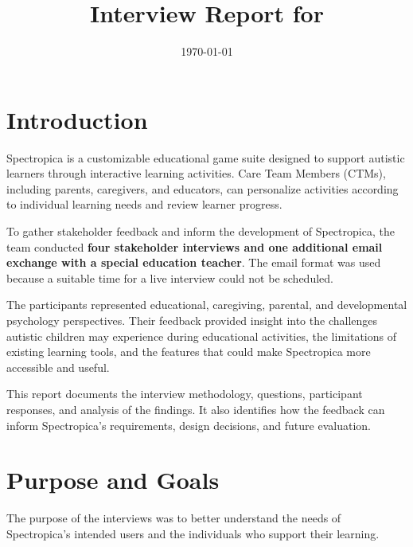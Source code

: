 \documentclass[12pt, titlepage]{article}
\title{Interview Report for \progname{}}
\author{\authname}
\date{\today}
\begin{document}
\maketitle
{}
\tableofcontents
\newpage
{}

\section{Introduction}

Spectropica is a customizable educational game suite designed to support autistic learners through interactive learning activities. Care Team Members (CTMs), including parents, caregivers, and educators, can personalize activities according to individual learning needs and review learner progress.

To gather stakeholder feedback and inform the development of Spectropica, the team conducted \textbf{four stakeholder interviews and one additional email exchange with a special education teacher}. The email format was used because a suitable time for a live interview could not be scheduled.

The participants represented educational, caregiving, parental, and developmental psychology perspectives. Their feedback provided insight into the challenges autistic children may experience during educational activities, the limitations of existing learning tools, and the features that could make Spectropica more accessible and useful.

This report documents the interview methodology, questions, participant responses, and analysis of the findings. It also identifies how the feedback can inform Spectropica's requirements, design decisions, and future evaluation.

\section{Purpose and Goals}

The purpose of the interviews was to better understand the needs of Spectropica's intended users and the individuals who support their learning.
\end{document}
